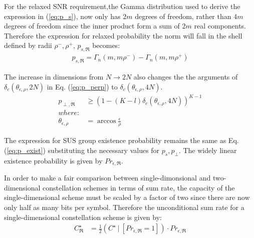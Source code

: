 For the relaxed SNR requirement,the Gamma distribution used to derive the expression in (\ref{eq:p_s}), now only has 2$m$ degrees of freedom, rather than 4$m$ degrees of freedom since the inner product form a sum of 2$m$ real components. Therefore the expression for relaxed probability the norm will fall in the shell defined by radii $\rho^-,\rho^+$, $p_{s,\mathfrak{R}}$ becomes:
\begin{equation}\label{eq:p_s_real}
    \begin{aligned}
        p_{s,\mathfrak{R}} = \Gamma_n(m,m\rho^-) - \Gamma_n(m,m\rho^+)
    \end{aligned}
\end{equation}

The increase in dimensions from $N \rightarrow 2N$ also changes the the arguments of $\delta_c(\theta_{\epsilon,\rho},2N)$ in Eq. (\ref{eq:p_perp}) to $\delta_c(\theta_{\epsilon,\rho},4N)$.
\begin{equation}\label{eq:p_perp_real}
    \begin{aligned}
        p_{\perp,\mathfrak{R}} &\geq (1-(K-l)\delta_c(\theta_{\epsilon,\rho},4N))^{K-1}\\
        where:\\
        \theta_{\epsilon,\rho} &= \arccos\frac{\epsilon}{\rho}
    \end{aligned}
\end{equation}

The expression for SUS group existence probability remains the same as Eq. (\ref{eq:p_exist}) substituting the necessary values for $p_s,p_\perp$. The widely linear existence probability is given by $Pr_{\epsilon,\mathfrak{R}}$.

In order to make a fair comparison between single-dimonsional and two-dimensional constellation schemes in terms of sum rate, the capacity of the single-dimensional scheme must be scaled by a factor of two since there are now only half as many bits per symbol. Therefore the unconditional sum rate for a single-dimensional constellation scheme is given by:
\begin{equation}\label{eq:sum_rate_real}
    \begin{aligned}
        C^{\star}_\mathfrak{R} &=  \frac{1}{2}(C^{\star} \ \vert \ [Pr_{\epsilon,\mathfrak{R}} = 1])\cdot Pr_{\epsilon,\mathfrak{R}}
    \end{aligned}
\end{equation}
